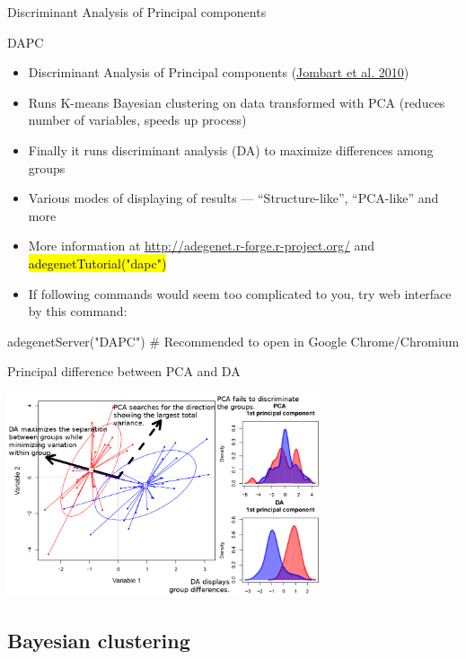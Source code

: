 \documentclass[compress, ucs, xelatex, 11pt, xcolor=svgnames,
	hyperref={
		bookmarks=true,
		unicode=true,
		colorlinks=true,
		pdftitle={Molecular data in R},
		plainpages=false,
		pdfauthor={Vojtech Zeisek},
		pdfsubject={Course about phylogeny and evolution in R},
		pdfcreator={XeLaTeX},
		pdfkeywords={R, evolution, phylogeny, molecular data},
		linkcolor=Tomato,
		anchorcolor=SaddleBrown,
		citecolor=Goldenrod,
		filecolor=DarkMagenta,
		menucolor=Sienna,
		urlcolor=DarkTurquoise,
		pdftex},
	url={hyphens, lowtilde} %
	]{beamer}
\renewcommand{\texttt}[1]{\hl{\ttfamily #1}}
\begin{document}
\begin{frame}{Discriminant Analysis of Principal components}
	\tableofcontents[currentsection, sectionstyle=show/hide, hideothersubsections]
\end{frame}

\begin{frame}[fragile]{DAPC}
	\label{DAPC}
	\begin{itemize}
		\item Discriminant Analysis of Principal components (\href{https://bmcgenet.biomedcentral.com/articles/10.1186/1471-2156-11-94}{Jombart et al. 2010})
		\item Runs K-means Bayesian clustering on data transformed with PCA (reduces number of variables, speeds up process)
		\item Finally it runs discriminant analysis (DA) to maximize differences among groups
		\item Various modes of displaying of results --- ``Structure-like'', ``PCA-like'' and more
		\item More information at \url{http://adegenet.r-forge.r-project.org/} and \texttt{adegenetTutorial("dapc")}
		\item If following commands would seem too complicated to you, try web interface by this command:
	\end{itemize}
	\begin{spluscode}
    adegenetServer("DAPC") # Recommended to open in Google Chrome/Chromium
	\end{spluscode}
\end{frame}

\begin{frame}{Principal difference between PCA and DA}
	\begin{center}
		\includegraphics[height=6cm]{dapc-da-pca.png}
	\end{center}
\end{frame}

\subsection{Bayesian clustering}
\end{document}
